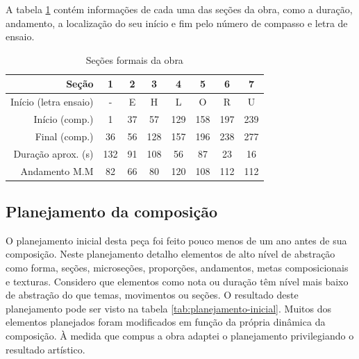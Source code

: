 A tabela \ref{tab:secoes-obra} contém informações de cada uma das
seções da obra, como a duração, andamento, a localização do seu início
e fim pelo número de compasso e letra de ensaio.

\begin{table}[!h]
  \centering
  \begin{tabular}{r|ccccccc}
    Seção & 1 & 2 & 3 & 4 & 5 & 6 & 7 \\
    \hline
    Início (letra ensaio) & - & E & H & L & O & R & U \\
    Início (comp.) & 1 & 37 & 57 & 129 & 158 & 197 & 239 \\
    Final (comp.) & 36 & 56 & 128 & 157 & 196 & 238 & 277 \\
    Duração aprox. (s) & 132 & 91 & 108 & 56 & 87 & 23 & 16\\
    Andamento M.M & 82 & 66 & 80 & 120 & 108 & 112 & 112 \\
  \end{tabular}
  \caption{Seções formais da obra}
  \label{tab:secoes-obra}
\end{table}

\subsection{Planejamento da composição}
\label{sec:plan-da-comp}

O planejamento inicial desta peça foi feito pouco menos de um ano
antes de sua composição. Neste planejamento detalho elementos de alto
nível de abstração como forma, seções, microseções, proporções,
andamentos, metas composicionais e texturas. Considero que elementos
como nota ou duração têm nível mais baixo de abstração do que temas,
movimentos ou seções. O resultado deste planejamento pode ser visto na
tabela \ref{tab:planejamento-inicial}. Muitos dos elementos planejados
foram modificados em função da própria dinâmica da composição. À
medida que compus a obra adaptei o planejamento privilegiando o
resultado artístico.

